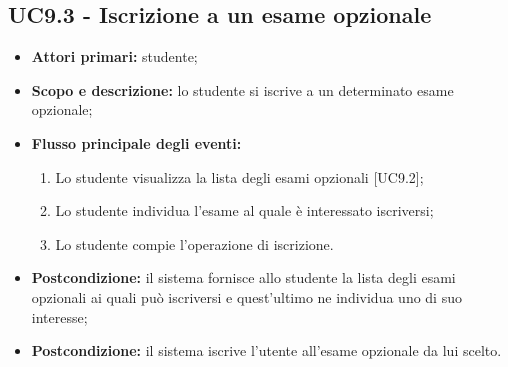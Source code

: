 \documentclass[AnalisiDeiRequisiti.tex]{subfiles}
\begin{document}
\subsection{UC9.3 - Iscrizione a un esame opzionale}
\begin{itemize}
	\item \textbf{Attori primari:} studente;
	\item \textbf{Scopo e descrizione:} lo studente si iscrive a un determinato esame opzionale;
	\item \textbf{Flusso principale degli eventi:}
	\begin{enumerate}
		\item Lo studente visualizza la lista degli esami opzionali [UC9.2];
		\item Lo studente individua l'esame al quale è interessato iscriversi;
		\item Lo studente compie l'operazione di iscrizione.
	\end{enumerate}
	\item \textbf{Postcondizione:} il sistema fornisce allo studente la lista degli esami opzionali ai quali può iscriversi e quest'ultimo ne individua uno di suo interesse;
	\item \textbf{Postcondizione:} il sistema iscrive l'utente all'esame opzionale da lui scelto.
\end{itemize}
\end{document}
